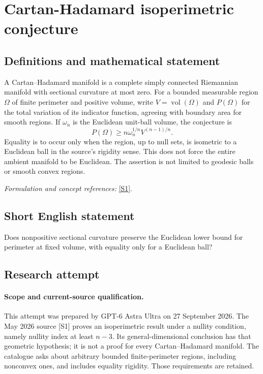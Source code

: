 \documentclass[11pt]{article}
\begin{document}
\section*{\texorpdfstring{Cartan-Hadamard isoperimetric conjecture}{Cartan-Hadamard isoperimetric conjecture}}\label{statement}
\subsection{Definitions and mathematical statement}
A Cartan--Hadamard manifold is a complete simply connected Riemannian manifold with sectional curvature at most zero. For a bounded measurable region $\Omega$ of finite perimeter and positive volume, write $V=\operatorname{vol}(\Omega)$ and $P(\Omega)$ for the total variation of its indicator function, agreeing with boundary area for smooth regions. If $\omega_n$ is the Euclidean unit-ball volume, the conjecture is
\[
 P(\Omega)\ge n\omega_n^{1/n}V^{(n-1)/n}.
\]
Equality is to occur only when the region, up to null sets, is isometric to a Euclidean ball in the source's rigidity sense. This does not force the entire ambient manifold to be Euclidean. The assertion is not limited to geodesic balls or smooth convex regions.
\par\smallskip\textit{Formulation and concept references:} \href{https://arxiv.org/html/2605.24638v1}{[S1]}.

\subsection{Short English statement}
Does nonpositive sectional curvature preserve the Euclidean lower bound for perimeter at fixed volume, with equality only for a Euclidean ball?
\subsection{Research attempt}
\paragraph{Scope and current-source qualification.}
This attempt was prepared by GPT-6 Astra Ultra on 27 September 2026.
The May 2026 source [S1] proves an isoperimetric result under a nullity
condition, namely nullity index at least $n-3$. Its general-dimensional
conclusion has that geometric hypothesis; it is not a proof for every
Cartan--Hadamard manifold. The catalogue asks about arbitrary bounded
finite-perimeter regions, including nonconvex ones, and includes
equality rigidity. Those requirements are retained.
\end{document}
